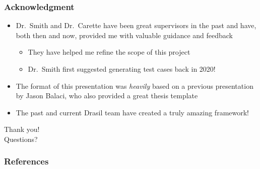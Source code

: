 \documentclass{beamer}
\begin{document}
\begin{frame}
    \frametitle{Acknowledgment}

    \begin{itemize}
        \item Dr.~Smith and Dr.~Carette have been great supervisors in the
              past and have, both then and now, provided me with valuable guidance
              and feedback
              \begin{itemize}
                  \item They have helped me refine the scope of this project
                  \item Dr.~Smith first suggested generating test cases back in 2020!
              \end{itemize}
        \item<2-> The format of this presentation was \emph{heavily} based on
              a previous presentation by Jason Balaci, who also provided a
              great thesis template
        \item<3-> The past and current Drasil team have created a truly amazing
              framework!
    \end{itemize}
\end{frame}


\begin{frame}
    \center
    \huge{Thank you!}\\
    \normalsize{Questions?}
\end{frame}



\begin{frame}
    \frametitle{References}

    
\end{frame}
\end{document}
